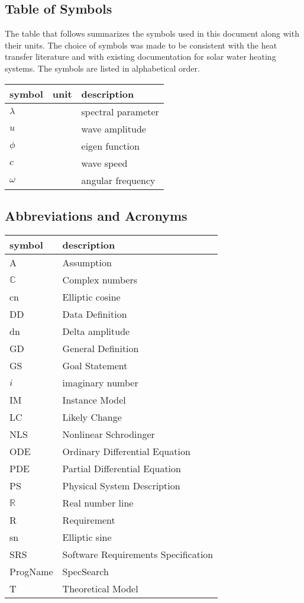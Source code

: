 \documentclass[12pt]{article}
\newcommand{\progname}{ProgName} %
\begin{document}
\subsection{Table of Symbols}

The table that follows summarizes the symbols used in this document along with
their units.  The choice of symbols was made to be consistent with the heat
transfer literature and with existing documentation for solar water heating
systems.  The symbols are listed in alphabetical order.

\renewcommand{\arraystretch}{1.2}
\noindent \begin{longtable*}{l l p{12cm}} \toprule
\textbf{symbol} & \textbf{unit} & \textbf{description}\\
\midrule 
$\lambda$ &  & spectral parameter
\\
$u$ &  & wave amplitude 
\\  
$\phi$ & & eigen function
\\ 
$c$ & & wave speed 
\\
$\omega$ & & angular frequency 
\\ 
\bottomrule
\end{longtable*}

\subsection{Abbreviations and Acronyms}

\renewcommand{\arraystretch}{1.2}
\begin{tabular}{l l} 
  \toprule		
  \textbf{symbol} & \textbf{description}\\
  \midrule 
  A & Assumption\\
  $\mathbb{C}$ & Complex numbers\\
  cn & Elliptic cosine \\
  DD & Data Definition\\
  dn & Delta amplitude \\
  GD & General Definition\\
  GS & Goal Statement\\
  $i$ & imaginary number\\
  IM & Instance Model\\
  LC & Likely Change\\
  NLS & Nonlinear Schrodinger\\
  ODE & Ordinary Differential Equation\\
  PDE & Partial Differential Equation\\
  PS & Physical System Description\\
  $\mathbb{R}$ & Real number line\\
  R & Requirement\\ 
  sn & Elliptic sine\\
  SRS & Software Requirements Specification\\
  \progname{} & SpecSearch\\
  T & Theoretical Model\\  
  \bottomrule
\end{tabular}\\
\end{document}
